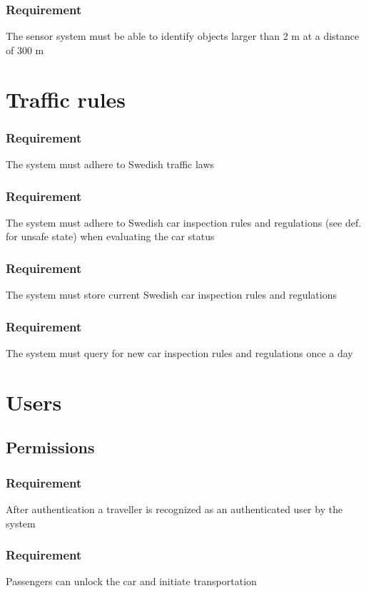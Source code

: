 \documentclass{article}
\begin{document}
{      \subsubsection{Requirement}
\hfill \break 
\- \- \-The sensor system must be able to identify objects larger than 2 m at a distance of 300 m
      
\section{Traffic rules}
    \subsubsection{Requirement}
\hfill \break 
\- \- \-The system must adhere to Swedish traffic laws
    \subsubsection{Requirement}
\hfill \break 
\- \- \-The system must adhere to Swedish car inspection rules and regulations (see def. for unsafe state) when evaluating the car status
    \subsubsection{Requirement}
\hfill \break 
\- \- \-The system must store current Swedish car inspection rules and regulations
    \subsubsection{Requirement}
\hfill \break 
\- \- \-The system must query for new car inspection rules and regulations once a day


\section{Users}
  \subsection{Permissions}
      \subsubsection{Requirement}
\hfill \break 
\- \- \-After authentication a traveller is recognized as an authenticated user by the system
      \subsubsection{Requirement}
\hfill \break 
\- \- \-Passengers can unlock the car and initiate transportation
}
\end{document}
